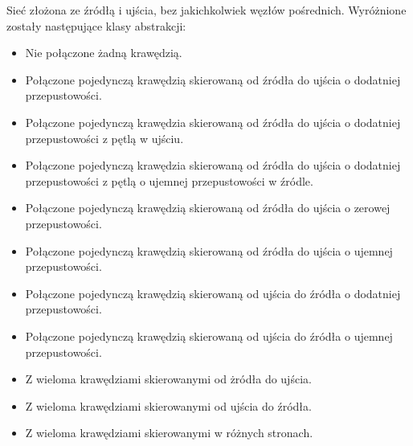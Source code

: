 \documentclass[10pt]{dokument-tiwo}
\begin{document}
Sieć złożona ze źródłą i ujścia, bez jakichkolwiek węzłów pośrednich. Wyróżnione zostały następujące klasy abstrakcji:
\begin{itemize}




    \item Nie połączone żadną krawędzią.
    \item Połączone pojedynczą krawędzią skierowaną od źródła do ujścia o dodatniej przepustowości.
    \item Połączone pojedynczą krawędzia skierowaną od źródła do ujścia o dodatniej przepustowości z pętlą w ujściu.
    \item Połączone pojedynczą krawędzia skierowaną od źródła do ujścia o dodatniej przepustowości z pętlą o ujemnej przepustowości w źródle.
    \item Połączone pojedynczą krawędzią skierowaną od źródła do ujścia o zerowej przepustowości.
    \item Połączone pojedynczą krawędzią skierowaną od źródła do ujścia o ujemnej przepustowości.
    \item Połączone pojedynczą krawędzią skierowaną od ujścia do źródła o dodatniej przepustowości.
    \item Połączone pojedynczą krawędzią skierowaną od ujścia do źródła o ujemnej przepustowości.
    \item Z wieloma krawędziami skierowanymi od żródła do ujścia.
    \item Z wieloma krawędziami skierowanymi od ujścia do źródła.
    \item Z wieloma krawędziami skierowanymi w różnych stronach.
\end{itemize}
\end{document}
